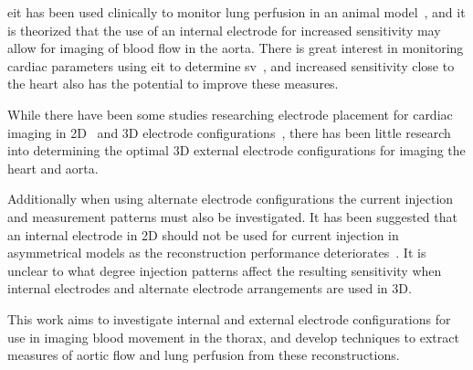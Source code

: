 \acrshort{eit} has been used clinically to monitor lung perfusion 
in an animal model~\parencite{Leonhardt2012,Nguyen2012}, and it is theorized that 
the use of an internal electrode for increased sensitivity may allow for 
imaging of blood flow in the aorta. 
There is great interest in monitoring cardiac parameters
using \acrshort{eit} to determine \acrfull{sv}~\parencite{Proenca2017,Braun2018}, and increased
sensitivity close to the heart also has the potential to improve
these measures.

While there have been some studies researching electrode placement for cardiac
imaging in 2D~\parencite{Noordegraaf1996} and 
3D electrode configurations~\parencite{Graham2007}, there has 
been little research into determining the optimal 3D external electrode configurations
for imaging the heart and aorta. 

Additionally when using alternate electrode configurations the current injection and 
measurement patterns must also be investigated. It has been suggested that  an internal electrode
in 2D
should not be used for current injection in asymmetrical models
as the reconstruction performance deteriorates~\parencite{NasehiTehrani2012}. 
It is unclear 
to what degree injection patterns affect the resulting sensitivity when
internal electrodes and alternate electrode arrangements are used in 3D.

This work aims to investigate internal and 
external electrode configurations for use in imaging blood movement 
in the thorax, and develop techniques to extract measures of 
aortic flow and lung perfusion from these reconstructions.

%

